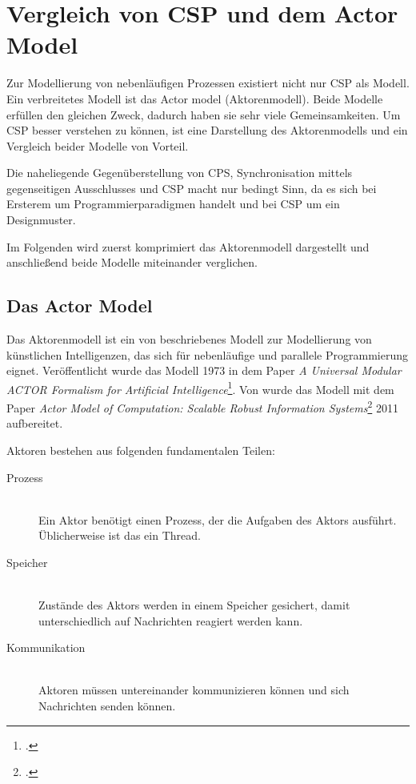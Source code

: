 \section{Vergleich von \acs{CSP} und dem Actor Model}

Zur Modellierung von nebenläufigen Prozessen existiert nicht nur \ac{CSP} als Modell. Ein verbreitetes Modell ist das Actor model (Aktorenmodell). Beide Modelle erfüllen den gleichen Zweck, dadurch haben sie sehr viele Gemeinsamkeiten. Um \ac{CSP} besser verstehen zu können, ist eine Darstellung des Aktorenmodells und ein Vergleich beider Modelle von Vorteil.

Die naheliegende Gegenüberstellung von \ac{CPS}, Synchronisation mittels gegenseitigen Ausschlusses und \ac{CSP} macht nur bedingt Sinn, da es sich bei Ersterem um Programmierparadigmen handelt und bei \ac{CSP} um ein Designmuster.

Im Folgenden wird zuerst komprimiert das Aktorenmodell dargestellt und anschließend beide Modelle miteinander verglichen.

\subsection{Das Actor Model}
Das Aktorenmodell ist ein von \citeauthor{ACTORS} beschriebenes Modell zur Modellierung von künstlichen Intelligenzen, das sich für nebenläufige und parallele Programmierung eignet. Veröffentlicht wurde das Modell 1973 in dem Paper \textit{A Universal Modular ACTOR Formalism for Artificial Intelligence}\footcite{ACTORS}. Von \citeauthor{ACTORSNEW} wurde das Modell mit dem Paper \textit{Actor Model of Computation: Scalable Robust Information Systems}\footcite{ACTORSNEW} 2011 aufbereitet. 

Aktoren bestehen aus folgenden fundamentalen Teilen:

\begin{description}
\item[Prozess]\hfill \\
Ein Aktor benötigt einen Prozess, der die Aufgaben des Aktors ausführt. Üblicherweise ist das ein Thread.
\item[Speicher]\hfill \\
Zustände des Aktors werden in einem Speicher gesichert, damit unterschiedlich auf Nachrichten reagiert werden kann.
\item[Kommunikation] \hfill \\
Aktoren müssen untereinander kommunizieren können und sich Nachrichten senden können.
\end{description}

